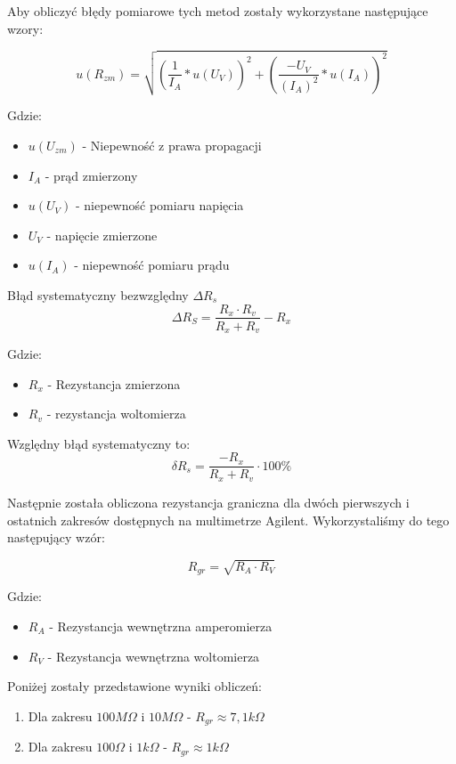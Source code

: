 \newpage
Aby obliczyć błędy pomiarowe tych metod zostały wykorzystane następujące wzory:

\begin{equation*}
    u(R_{zm})=\sqrt{\left(\frac{1}{I_A}*u(U_V)\right)^2+\left(\frac{-U_V}{(I_A)^2}*u(I_A)\right)^2}
\end{equation*}

Gdzie:
\begin{itemize}
    \item $u(U_{zm})$ - Niepewność z prawa propagacji
    \item $I_A$ - prąd zmierzony
    \item $u(U_V)$ - niepewność pomiaru napięcia
    \item $U_V$ - napięcie zmierzone
    \item $u(I_A)$ - niepewność pomiaru prądu
\end{itemize}

\vspace{0.4cm}
Błąd systematyczny bezwzględny $\Delta R_s$
\begin{equation*}
    \Delta R_S=\frac{R_x \cdot R_v}{R_x + R_v}-R_x
\end{equation*}

Gdzie:
\begin{itemize}
    \item $R_x$ - Rezystancja zmierzona
    \item $R_v$ -  rezystancja woltomierza
\end{itemize}

Względny błąd systematyczny to:
\begin{equation*}
    \delta R_s=\frac{-R_x}{R_x+R_v} \cdot 100\%
\end{equation*}

\vspace{0.5cm}
Następnie została obliczona rezystancja graniczna dla dwóch pierwszych i ostatnich zakresów dostępnych na multimetrze Agilent. Wykorzystaliśmy do tego następujący wzór:

$$R_{gr}=\sqrt{R_A \cdot R_V}$$

Gdzie:
\begin{itemize}
    \item $R_A$ - Rezystancja wewnętrzna amperomierza
    \item $R_V$ - Rezystancja wewnętrzna woltomierza
\end{itemize}

\vspace{0.2cm}
Poniżej zostały przedstawione wyniki obliczeń:
\begin{enumerate}
    \item Dla zakresu $100M\Omega$ i $10M\Omega$ - $R_{gr}\approx 7,1k\Omega$
    \item Dla zakresu $100\Omega$ i $1k\Omega$ - $R_{gr}\approx 1k\Omega$
\end{enumerate}